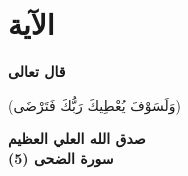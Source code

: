 \chapter*{الآية}

\begin{Large}
	\textbf{قال تعالى}
	\begin{center}
(وَلَسَوْفَ يُعْطِيكَ رَبُّكَ فَتَرْضَى)
	\end{center}
	\begin{flushleft}
		\textbf{صدق الله العلي العظيم}\\
		\noindent
		\textbf{سورة الضحى (5)}
	\end{flushleft}
	
\end{Large}


